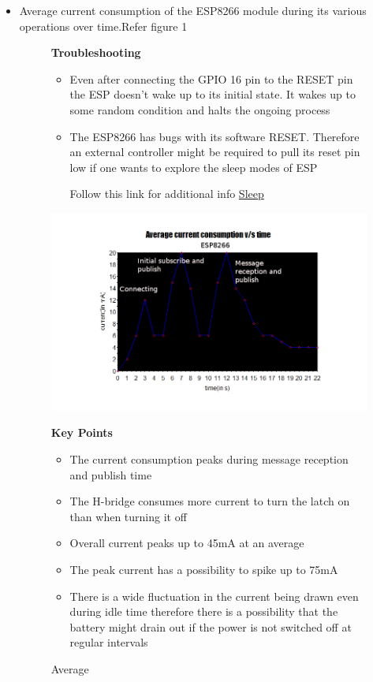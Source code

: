 \documentclass[16pt]{article}
\begin{document}
\begin{itemize}

\item
  Average current consumption of the ESP8266 module during its various
  operations over time.Refer figure 1 


\begin{figure}

\textbf{Troubleshooting}

\vspace{0.2cm}
\begin{itemize}
\item
  Even after connecting the GPIO 16 pin to the RESET pin the ESP doesn't
  wake up to its initial state. It wakes up to some random condition and
  halts the ongoing process
\item
  The ESP8266 has bugs with its software RESET. Therefore an external
  controller might be required to pull its reset pin low if one wants to
  explore the sleep modes of ESP
  
  Follow this link for additional info
\href{http://tinker.yeoman.com.au/2015/03/08/reducing-esp8266-power-consumption-using-deep-sleep/}{Sleep}
\end{itemize}
\includegraphics[width=1.2\textwidth]{images/average_current1.png}
\caption{Average}
\textbf{Key Points}

  \begin{itemize}

  \item
    The current consumption peaks during message reception and publish
    time
  \item
    The H-bridge consumes more current to turn the latch on than when
    turning it off
  \item
    Overall current peaks up to 45mA at an average
  \item
    The peak current has a possibility to spike up to 75mA
  \item
    There is a wide fluctuation in the current being drawn even during
    idle time therefore there is a possibility that the battery might
    drain out if the power is not switched off at regular intervals
  \end{itemize}
\end{figure}



\end{itemize}
\end{document}
